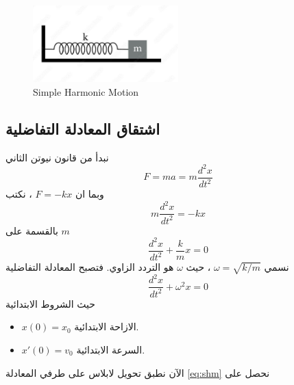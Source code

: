 \begin{english}
	\begin{figure}[ht]
		\centering
		\includegraphics[width=0.5\textwidth]{Figures/shm.jpg}
		\caption{Simple Harmonic Motion}
	\end{figure}
\end{english}

\subsection*{اشتقاق المعادلة التفاضلية}
نبدأ من قانون نيوتن الثاني
\[
F = ma = m \frac{d^2 x}{dt^2}
\]
وبما ان $F = -kx$ ، نكتب
\[
m \frac{d^2 x}{dt^2} = - kx
\]
بالقسمة على $m$
\[
\frac{d^2 x}{dt^2} + \frac{k}{m} x = 0
\]
نسمي $\omega =\sqrt{ k/m}$ ، حيث $\omega$ هو التردد الزاوي. فتصبح المعادلة التفاضلية
\begin{equation}
	\label{eq:shm}
	\frac{d^2 x}{dt^2} + \omega^2 x = 0
\end{equation}
حيث الشروط الابتدائية
\begin{itemize}
	\item $x(0) = x_0$ الازاحة الابتدائية.
	\item $x'(0) = v_0$ السرعة الابتدائية.
\end{itemize}
الآن نطبق تحويل لابلاس على طرفي المعادلة \eqref{eq:shm} نحصل على

